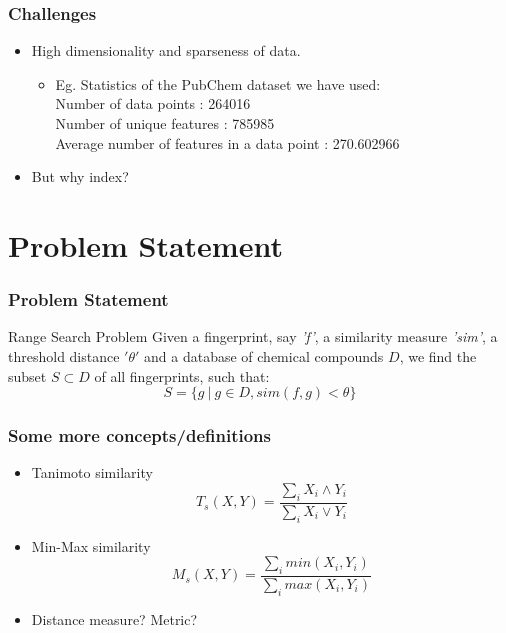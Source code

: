 \documentclass{beamer}
\begin{document}
\begin{frame}
\frametitle{Challenges}

\begin{itemize}
	\item<1-> High dimensionality and sparseness of data.
\begin{itemize}	
	\item<2->[] Eg. Statistics of the PubChem dataset we have used:\\
	Number of data points : 264016 \\ 
	Number of unique features : 785985 \\ 
	Average number of features in a data point : 270.602966 \\ 
\end{itemize}

	\item<3-> But why index?
	
\end{itemize}

\end{frame}

\section{Problem Statement}
\begin{frame}
\frametitle{Problem Statement}

\begin{block}{Range Search Problem}
Given a fingerprint, say \textit{'f'}, a similarity measure \textit{'sim'}, a threshold distance \textbf{$'\theta'$} and a database of chemical compounds $D$, we find the subset $S \subset D$ of all fingerprints, such that: \\
\begin{equation}
 S= \{g~ |~ g \in D,sim(f,g) < \theta\}
\end{equation}
\end{block}


\end{frame}

\begin{frame}
\frametitle{Some more concepts/definitions}

\begin{itemize}
	\item<1-> Tanimoto similarity
	\begin{equation}
	T_s(X,Y) = \frac{\sum \limits_i X_i \wedge Y_i} {\sum \limits_i X_i \vee Y_i}	
	\end{equation}
	\item<2-> Min-Max similarity
	\begin{equation}
	M_s(X,Y) = \frac{\sum \limits_{i} min(X_i, Y_i)}{\sum \limits_{i} max(X_i, Y_i)}
	\end{equation}	
	\item<3-> Distance measure? Metric?
\end{itemize}

\end{frame}
\end{document}
